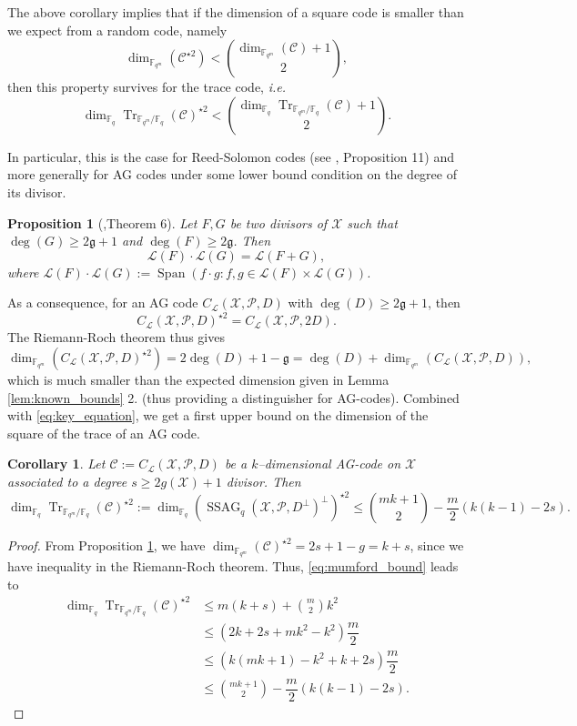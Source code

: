 \documentclass[a4paper]{article}
\newtheorem{proposition}[thm]{Proposition}
\newtheorem{coro}[thm]{Corollary}
\theoremstyle{definition}
\theoremstyle{remark}
\newcommand{\calP}{\mathcal{P}}
\newcommand{\calL}{\mathcal{L}}
\newcommand{\calC}{\mathcal{C}}
\newcommand{\calX}{\mathcal{X}}
\newcommand{\fqm}{\mathbb{F}_{q^m}}
\newcommand{\fq}{\mathbb{F}_{q}}
\newcommand{\Tr}[1]{\operatorname{Tr}_{\mathbb{F}_{q^m}/\fq}\left(#1\right)}
\newcommand{\Span}[1]{\operatorname{Span}\left(#1\right)}
\newcommand{\ssag}[1]{\operatorname{SSAG}_{q}\left(#1\right)}
\begin{document}
The above corollary implies that if the dimension of a square code is smaller than we expect from a random code, namely
\[ \dim_{\fqm} (\calC^{\star 2}) < \binom{\dim_{\fqm} (\calC)+1}{2},\]
then this property survives for the trace code, \emph{i.e.}
\[\dim_{\fq} \Tr{\calC}^{\star 2} < \binom{\dim_{\fq} \Tr{\calC}+1}{2}.\]

In particular, this is the case for Reed-Solomon codes (see \cite{MT21}, Proposition 11) and more generally for AG codes under some lower bound condition on the degree of its divisor.


\begin{proposition} [\cite{Mum70},Theorem 6] \label{prop:mumford_result}
	Let $F,G$ be two divisors of $\calX$ such that $\deg(G) \geq 2\mathfrak{g}+1$ and $\deg(F) \geq 2\mathfrak{g}$. Then
	\[ \calL(F) \cdot \calL(G) = \calL(F+G),\]
	where $\calL(F) \cdot \calL(G) := \Span{ f \cdot g : f,g \in \calL(F) \times \calL(G)}$.
\end{proposition}

\noindent As a consequence, for an AG code  $C_{\calL}(\calX,\mathcal{P},D)$ with $\deg(D) \geq 2\mathfrak{g}+1$, then 
\[ C_{\calL}(\calX,\mathcal{P},D)^{\star2} = C_{\calL}(\calX,\calP,2D).\]
The Riemann-Roch theorem thus gives
\[ \dim_{\fqm}(C_{\calL}(\calX,\mathcal{P},D)^{\star2}) = 2\deg(D)+1-\mathfrak{g}= \deg(D) + \dim_{\fqm}(C_{\calL}(\calX,\mathcal{P},D)), \]
which is much smaller than the expected dimension given in Lemma \ref{lem:known_bounds} 2. (thus providing a distinguisher for AG-codes). Combined with \eqref{eq:key_equation}, we get a first upper bound on the dimension of the square of the trace of an AG code.


\begin{coro} \label{coro:1st_bound_mumford}
	Let $\mathcal{C} := C_{\calL}(\calX,\mathcal{P},D)$ be a $k$--dimensional AG-code on $\calX$ associated to a degree $s \geq 2g(\calX)+1$ divisor. Then
	\[ \dim_{\fq}\Tr{\calC}^{\star2} := \dim_{\fq} (\ssag{\calX,\calP,D^{\perp}}^{\perp})^{\star2}  \leq \binom{mk+1}{2} - \dfrac{m}{2} (k(k-1)-2s).\]
\end{coro}


\begin{proof}
	From Proposition \ref{prop:mumford_result}, we have $\dim_{\fqm}(\calC)^{\star2} = 2s+1-g = k+s$, since we have inequality in the Riemann-Roch theorem. Thus, \eqref{eq:mumford_bound} leads to
	\begin{align*}
		\dim_{\fq}\Tr{\calC}^{\star2} &\leq m(k+s) + \binom{m}{2}k^2 \\
		&\leq (2k+2s+mk^2-k^2) \dfrac{m}{2} \\
		&\leq (k(mk+1)-k^2+k+2s) \dfrac{m}{2} \\
		&\leq \binom{mk+1}{2} - \dfrac{m}{2}(k(k-1)-2s) .
	\end{align*}
\end{proof}
\end{document}
